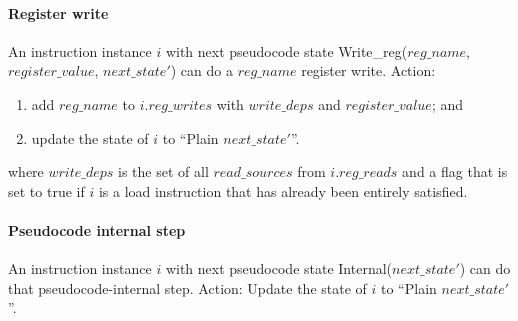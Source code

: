 \paragraph{Register write}\label{omm:thread:reg_write}
An instruction instance $i$ with next pseudocode state {\sc Write\_reg}($reg\_name$, $register\_value$, $next\_state'$) can do a $reg\_name$ register write.
Action:
\begin{enumerate}
\item add $reg\_name$ to $i.reg\_writes$ with $write\_deps$ and $register\_value$; and
\item update the state of $i$ to ``{\sc Plain} $next\_state'$''.
\end{enumerate}
where $write\_deps$ is the set of all $read\_sources$ from $i.reg\_reads$ and a flag that is set to true if $i$ is a load instruction that has already been entirely satisfied.


\paragraph{Pseudocode internal step}\label{omm:thread:sail_interp}
An instruction instance $i$ with next pseudocode state {\sc Internal}($next\_state'$) can do that pseudocode-internal step.
Action: Update the state of $i$ to ``{\sc Plain} $next\_state'$''.


